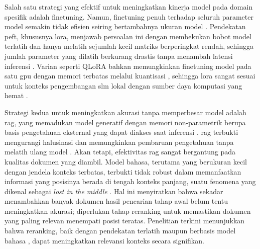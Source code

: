 Salah satu strategi yang efektif untuk meningkatkan kinerja model pada domain spesifik adalah \gls{finetuning}. Namun, \gls{finetuning} penuh terhadap seluruh parameter model semakin tidak efisien seiring bertambahnya ukuran model \citep{ding2023delta}. Pendekatan \gls{peft}, khususnya \gls{lora}, menjawab persoalan ini dengan membekukan bobot model terlatih dan hanya melatih sejumlah kecil matriks berperingkat rendah, sehingga jumlah parameter yang dilatih berkurang drastis tanpa menambah latensi inferensi \citep{hu2022lora}. Varian seperti QLoRA bahkan memungkinkan \gls{finetuning} model pada satu \gls{gpu} dengan memori terbatas melalui kuantisasi \citep{dettmers2023qlora}, sehingga \gls{lora} sangat sesuai untuk konteks pengembangan \gls{slm} lokal dengan sumber daya komputasi yang hemat \citep{mao2024lorasurvey}.

Strategi kedua untuk meningkatkan akurasi tanpa memperbesar model adalah \gls{rag}, yang memadukan model generatif dengan memori non-parametrik berupa basis pengetahuan eksternal yang dapat diakses saat inferensi \citep{lewis2020rag}. \gls{rag} terbukti mengurangi halusinasi dan memungkinkan pembaruan pengetahuan tanpa melatih ulang model \citep{gao2023ragsurvey}. Akan tetapi, efektivitas \gls{rag} sangat bergantung pada kualitas dokumen yang diambil. Model bahasa, terutama yang berukuran kecil dengan jendela konteks terbatas, terbukti tidak robust dalam memanfaatkan informasi yang posisinya berada di tengah konteks panjang, suatu fenomena yang dikenal sebagai \textit{lost in the middle} \citep{liu2024lostmiddle}. Hal ini menyiratkan bahwa sekadar menambahkan banyak dokumen hasil pencarian tahap awal belum tentu meningkatkan akurasi; diperlukan tahap \gls{reranking} untuk memastikan dokumen yang paling relevan menempati posisi teratas. Penelitian terkini menunjukkan bahwa \gls{reranking}, baik dengan pendekatan terlatih \citep{ren2021rocketqav2} maupun berbasis model bahasa \citep{sun2023rankgpt}, dapat meningkatkan relevansi konteks secara signifikan.

